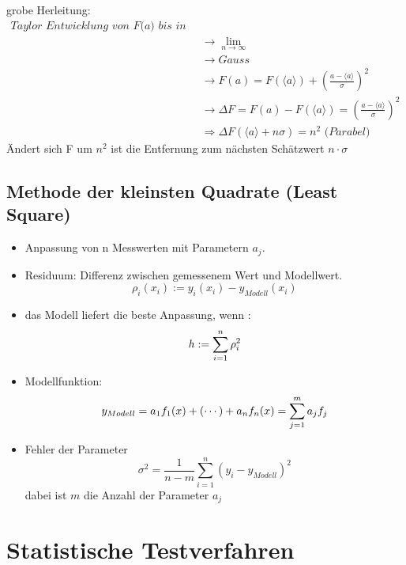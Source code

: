 \documentclass[10pt,a4paper]{article}
\begin{document}
grobe Herleitung:
\begin{align*}
\textit{Taylor Entwicklung von F(a) bis in 2te Ordnung dann} \\
&\rightarrow \lim_{n\rightarrow \infty} \\ 
&\rightarrow Gauss \\ 
&\rightarrow F(a)=F(\langle a \rangle) + (\frac{a-\langle a \rangle}{\sigma})^2 \\
&\rightarrow \Delta F = F(a) - F(\langle a \rangle) =(\frac{a-\langle a \rangle}{\sigma})^2 \\
&\Rightarrow \Delta F(\langle a \rangle + n\sigma)=n^2 \textit{ (Parabel)}
\end{align*}
Ändert sich F um $n^2$ ist die Entfernung zum nächsten Schätzwert $n\cdot\sigma$ 

\newpage
\subsection{Methode der kleinsten Quadrate (Least Square)}
\begin{itemize}
\item Anpassung von n Messwerten mit Parametern $a_j$.
\item Residuum: Differenz zwischen gemessenem Wert und Modellwert.
\begin{equation}
\rho_i(x_i):=y_i(x_i)-y_{Modell}(x_i)
\end{equation}
\item das Modell liefert die beste Anpassung, wenn :
\begin{equation}
h :=\sum^{n}_{i=1}{\rho^2_i} \notag
\end{equation}
\item Modellfunktion:
\begin{equation}
y_{Modell}=a_1f_1(x)+ (\cdots) + a_nf_n(x)=\sum^{m}_{j=1}a_jf_j  \notag
\end{equation}
\item Fehler der Parameter
\begin{equation}
\sigma^2=\frac{1}{n-m}\sum^{n}_{i=1}{(y_i-y_{Modell})^2}
\end{equation}
dabei ist $m$ die Anzahl der Parameter $a_j$
\end{itemize}

\section{Statistische Testverfahren}
\end{document}
